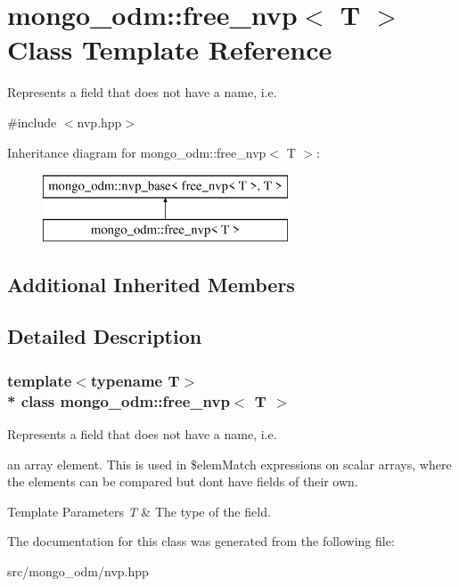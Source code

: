\hypertarget{classmongo__odm_1_1free__nvp}{}\section{mongo\+\_\+odm\+:\+:free\+\_\+nvp$<$ T $>$ Class Template Reference}
\label{classmongo__odm_1_1free__nvp}


Represents a field that does not have a name, i.\+e.  




{\ttfamily \#include $<$nvp.\+hpp$>$}

Inheritance diagram for mongo\+\_\+odm\+:\+:free\+\_\+nvp$<$ T $>$\+:\begin{figure}[H]
\begin{center}
\leavevmode
\includegraphics[height=2.000000cm]{classmongo__odm_1_1free__nvp}
\end{center}
\end{figure}
\subsection*{Additional Inherited Members}


\subsection{Detailed Description}
\subsubsection*{template$<$typename T$>$\\*
class mongo\+\_\+odm\+::free\+\_\+nvp$<$ T $>$}

Represents a field that does not have a name, i.\+e. 

an array element. This is used in \$elem\+Match expressions on scalar arrays, where the elements can be compared but don\textquotesingle{}t have fields of their own. 
\begin{DoxyTemplParams}{Template Parameters}
{\em T} & The type of the field. \\
\hline
\end{DoxyTemplParams}


The documentation for this class was generated from the following file\+:\begin{DoxyCompactItemize}
\item 
src/mongo\+\_\+odm/nvp.\+hpp\end{DoxyCompactItemize}
